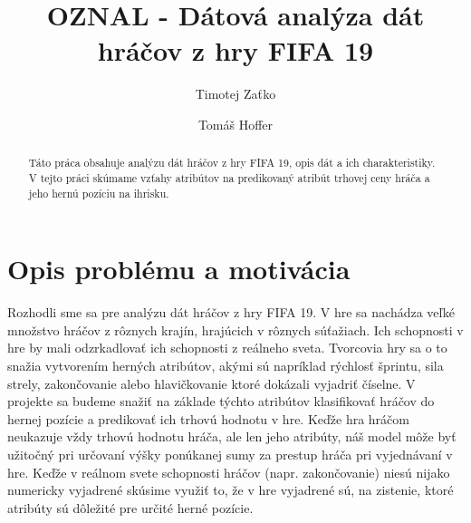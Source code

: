 \documentclass[runningheads]{llncs}
\begin{document}
%
\title{OZNAL - Dátová analýza dát hráčov z hry FIFA 19}
%
%
\author{Timotej Zaťko \and Tomáš Hoffer}
%
%
%
\maketitle              %
%
\begin{abstract}
Táto práca obsahuje analýzu dát hráčov z hry FIFA 19, opis dát a ich charakteristiky. V tejto práci skúmame vzťahy atribútov na predikovaný atribút trhovej ceny hráča a jeho hernú pozíciu na ihrisku.

\end{abstract}

\section{Opis problému a motivácia}

Rozhodli sme sa pre analýzu dát hráčov z hry FIFA 19. V hre sa nachádza veľké množstvo hráčov z rôznych krajín, hrajúcich v rôznych súťažiach. Ich schopnosti v hre by mali odzrkadlovať ich schopnosti z reálneho sveta. Tvorcovia hry sa o to snažia vytvorením herných atribútov, akými sú napríklad rýchlosť šprintu, sila strely, zakončovanie alebo hlavičkovanie ktoré dokázali vyjadriť číselne. V projekte sa budeme snažiť na základe týchto atribútov klasifikovať hráčov do hernej pozície a predikovať ich trhovú hodnotu v hre. Keďže hra hráčom neukazuje vždy trhovú hodnotu hráča, ale len jeho atribúty, náš model môže byť užitočný pri určovaní výšky ponúkanej sumy za prestup hráča pri vyjednávaní v hre. Keďže v reálnom svete schopnosti hráčov (napr. zakončovanie) niesú nijako numericky vyjadrené skúsime využiť to, že v hre vyjadrené sú, na zistenie, ktoré atribúty sú dôležité pre určité herné pozície.
\end{document}
